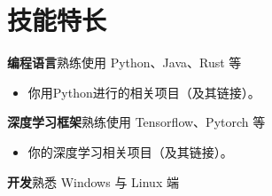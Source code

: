 \documentclass[11pt]{article}
\newcommand{\primarycolor}{\color{CUGblue}}
\newlength{\iconwidth}
\begin{document}
    
    \begin{minipage}[t]{\textwidth}
        \section[技能特长]{\makebox[\iconwidth][c]{\primarycolor{\faLaptopCode}}\quad 技能特长}
        {\large \textbf{编程语言}}\quad 熟练使用 Python、Java、Rust 等
		\begin{itemize}
			\item 你用Python进行的相关项目（及其链接）。
		\end{itemize}
		\vspace{0.5em}
        {\large \textbf{深度学习框架}}\quad 熟练使用 Tensorflow、Pytorch 等
		\begin{itemize}
			\item 你的深度学习相关项目（及其链接）。
		\end{itemize}
		\vspace{0.5em}
        {\large \textbf{开发}}\quad 熟悉 Windows 与 Linux 端
		\vspace{0.5em}

	\vspace{1.2em}
    \end{minipage}
    
	
    
\end{document}
